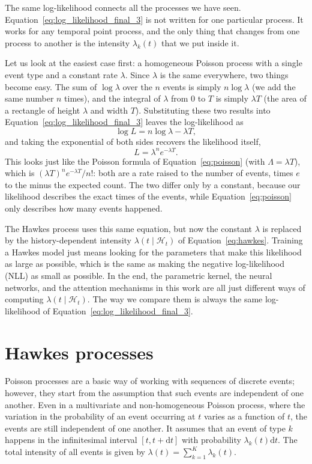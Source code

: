     The same log-likelihood connects all the processes we have seen. Equation~\eqref{eq:log_likelihood_final_3} is not written for one particular process. It works for any temporal point process, and the only thing that changes from one process to another is the intensity $\lambda_k(t)$ that we put inside it.

    Let us look at the easiest case first: a homogeneous Poisson process with a single event type and a constant rate $\lambda$. Since $\lambda$ is the same everywhere, two things become easy. The sum of $\log \lambda$ over the $n$ events is simply $n \log \lambda$ (we add the same number $n$ times), and the integral of $\lambda$ from $0$ to $T$ is simply $\lambda T$ (the area of a rectangle of height $\lambda$ and width $T$). Substituting these two results into Equation~\eqref{eq:log_likelihood_final_3} leaves the log-likelihood as
%
\[
    \log L = n \log \lambda - \lambda T ,
\]
%
and taking the exponential of both sides recovers the likelihood itself,
%
\[
    L = \lambda^{n} e^{-\lambda T} .
\]
%
This looks just like the Poisson formula of Equation~\eqref{eq:poisson} (with $\Lambda = \lambda T$), which is $(\lambda T)^{n} e^{-\lambda T} / n!$: both are a rate raised to the number of events, times $e$ to the minus the expected count. The two differ only by a constant, because our likelihood describes the exact times of the events, while Equation~\eqref{eq:poisson} only describes how many events happened.

    The Hawkes process uses this same equation, but now the constant $\lambda$ is replaced by the history-dependent intensity $\lambda(t \mid \mathcal{H}_t)$ of Equation~\eqref{eq:hawkes}. Training a Hawkes model just means looking for the parameters that make this likelihood as large as possible, which is the same as making the negative log-likelihood (\gls{NLL}) as small as possible. In the end, the parametric kernel, the neural networks, and the attention mechanisms in this work are all just different ways of computing $\lambda(t \mid \mathcal{H}_t)$. The way we compare them is always the same log-likelihood of Equation~\eqref{eq:log_likelihood_final_3}.

\section{Hawkes processes}\label{sec:processos-de-hawkes}

    Poisson processes are a basic way of working with sequences of discrete events; however, they start from the assumption that such events are independent of one another. Even in a multivariate and non-homogeneous Poisson process, where the variation in the probability of an event occurring at $t$ varies as a function of $t$, the events are still independent of one another. It assumes that an event of type $k$ happens in the infinitesimal interval $[t,t+\mathrm{d}t]$ with probability $\lambda_k(t)\mathrm{d}t$. The total intensity of all events is given by $\lambda(t)=\sum_{k=1}^{K}\lambda_k(t)$.

